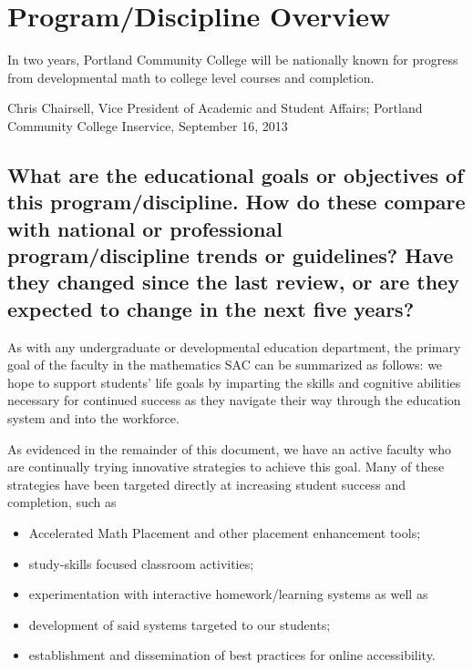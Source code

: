 \chapter{Program/Discipline Overview}

\epigraph{In two years, Portland Community College will be nationally known for
progress from developmental math to college level courses and completion.}
{Chris Chairsell, Vice President of Academic and Student Affairs; Portland 
Community College Inservice, September 16, 2013}

\section{What are the educational goals or objectives of this
program/discipline.   How do these compare with national or professional
program/discipline trends or guidelines?   Have they changed since the last
review, or are they expected to change in the next five years? }

As with any undergraduate or developmental education department, the primary
goal of the faculty in the mathematics SAC can be summarized as follows: we hope
to support students' life goals by imparting the skills and cognitive
abilities necessary for continued success as they navigate their way through the
education system and into the workforce.

As evidenced in the remainder of this document, we have an active faculty who
are continually trying innovative strategies to achieve this goal.  Many of
these strategies have been targeted directly at increasing student success and
completion, such as
\begin{itemize}
  \item Accelerated Math Placement and other placement enhancement tools;
  \item study-skills focused classroom activities;
  \item experimentation with interactive homework/learning systems as well as
  \item development of said systems targeted to our students;
  \item establishment and dissemination of best practices for online accessibility.
\end{itemize}

